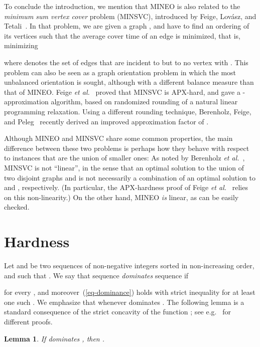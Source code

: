 \documentclass[11pt]{article}
\newtheorem{lemma}{Lemma}
\begin{document}
To conclude the introduction, we mention that MINEO is also related to
the {\em minimum sum vertex cover} problem (MINSVC), introduced by Feige, Lov{\'a}sz, and Tetali~\cite{FLT04}. In that problem, we are given a graph , and have to find an ordering  of its vertices such that the average cover time of an edge is minimized, that is, minimizing

where  denotes the set of edges that are incident to  but to no vertex  with . This problem can also be seen as a graph orientation problem in which the most unbalanced orientation is sought, although with a different balance measure than that of MINEO. Feige {\em et al.}~\cite{FLT04} proved that MINSVC is APX-hard, and gave a -approximation algorithm, based on randomized rounding of a natural linear programming relaxation. Using a different rounding technique, Berenholz, Feige, and Peleg~\cite{BFP06} recently derived an improved approximation factor of .

Although MINEO and MINSVC share some common properties, the main difference between these two problems is perhaps how they behave with respect to instances that are the union of smaller ones: As noted by Berenholz {\em et al.}~\cite{BFP06}, MINSVC is not ``linear'', in the sense that an optimal solution to the union of two disjoint graphs  and  is not necessarily a combination of an optimal solution to  and , respectively. (In particular, the APX-hardness proof of Feige {\em et al.}~\cite{FLT04} relies on this non-linearity.) On the other hand, MINEO {\em is} linear, as can be easily checked.

\section{Hardness}
\label{sec-hardness}

Let  and  be two sequences of non-negative integers sorted in non-increasing order, and such that . We say that sequence  {\em dominates} sequence  if 

for every , and moreover~(\ref{eq-dominance}) holds with strict inequality for at least one such . We emphasize that  whenever  dominates . The following lemma is a standard consequence of the strict concavity of the function ; see e.g.~\cite{MEC-ISAAC05, FHM-soda, HLP88} for different proofs. 

\begin{lemma}
\label{lem:jungle}
If  dominates , then . 
\end{lemma}
\end{document}
